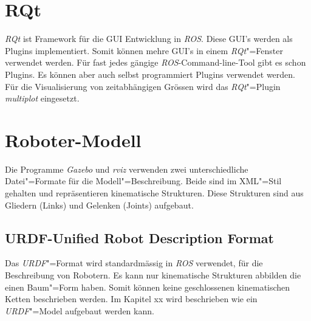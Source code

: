 


\section{RQt}
\textit{RQt} ist Framework für die GUI Entwicklung in \textit{ROS}.
Diese GUI's werden als Plugins implementiert.
Somit können mehre GUI's in einem \textit{RQt}"=Fenster verwendet werden.
Für fast jedes gängige \textit{ROS}-Command-line-Tool gibt es schon Plugins. %
Es können aber auch selbst programmiert Plugins verwendet werden. 
Für die Visualisierung von zeitabhängigen Grössen wird das \textit{RQt}"=Plugin \textit{multiplot} eingesetzt. %



\section{Roboter-Modell} %

Die Programme \textit{Gazebo} und \textit{rviz} verwenden zwei unterschiedliche Datei"=Formate für die Modell"=Beschreibung.
Beide sind im XML"=Stil gehalten und repräsentieren kinematische Strukturen.
Diese Strukturen sind aus Gliedern (Links) und Gelenken (Joints) aufgebaut.

\subsection{URDF-Unified Robot Description Format}
Das \textit{URDF}"=Format wird standardmässig in \textit{ROS} verwendet, für die Beschreibung von Robotern.
Es kann nur kinematische Strukturen abbilden die einen Baum"=Form haben.
Somit können keine geschlossenen kinematischen Ketten beschrieben werden.
Im Kapitel xx wird beschrieben wie ein \textit{URDF}"=Model aufgebaut werden kann. %

